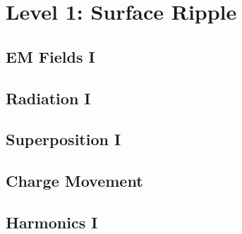 
\section{Level 1: Surface Ripple}

\subsection{EM Fields I}

\subsection{Radiation I}


\subsection{Superposition I}

\subsection{Charge Movement}



\subsection{Harmonics I}
